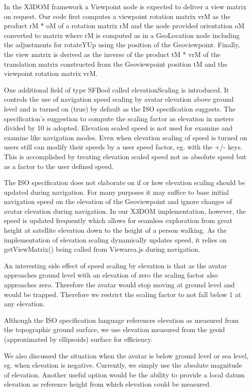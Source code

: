 \documentclass{acmsiggraph}                     %
\begin{document}
In the X3DOM framework a Viewpoint node is expected to deliver a view matrix on request. Our code first computes a viewpoint rotation matrix vrM as the product rM * oM of a rotation matrix rM and the node provided orientation oM converted to matrix where rM is computed as in a GeoLocation node including the adjustments for rotateYUp using the position of the Geoviewpoint. Finally, the view matrix is derived as the inverse of the product tM * vrM of the translation matrix constructed from the Geoviewpoint position tM and the viewpoint rotation matrix vrM.

One additional field of type SFBool called elevationScaling is introduced. It controls the use of navigation speed scaling by avatar elevation above ground level and is turned on (true) by default as the ISO specification suggests. The specification's suggestion to compute the scaling factor as elevation in meters divided by 10 is adopted. Elevation scaled speed is not used for examine and examine like navigation modes. Even when elevation scaling of speed is turned on users still can modify their speeds by a user speed factor, eg. with the +/- keys. This is accomplished by treating elevation scaled speed not as absolute speed but as a factor to the user defined speed. 

The ISO specification does not elaborate on if or how elevation scaling should be updated during navigation. For many purposes it may suffice to base initial navigation speed on the elevation of the Geoviewpoint and ignore changes of avatar elevation during navigation. In our X3DOM implementation, however, the speed is updated frequently which allows for seamless exploration from great height at satellite elevation down to the height of a person walking. As the implementation of elevation scaling dynamically updates speed, it relies on getViewMatrix() being called from Viewarea.js during navigation.

An interesting side effect of speed scaling by elevation is that as the avatar approaches ground level with an elevation of zero the scaling factor also approaches zero. Therefore the avatar would stop moving at ground level and would be trapped. Therefore we restrict  the scaling factor to not fall below 1 at any elevation.

Although the ISO specification language references elevation as measured from the topographic ground surface, we use elevation measured from the geoid (approximated by ellipsoids) surface for efficiency.

We also discussed the situation when the avatar is below ground level or sea level, eg. when elevation is negative. Currently, we simply use the absolute magnitude of elevation. Another useful option would be the ability to provide a local datum elevation as reference height from which elevation could be measured.
\end{document}
